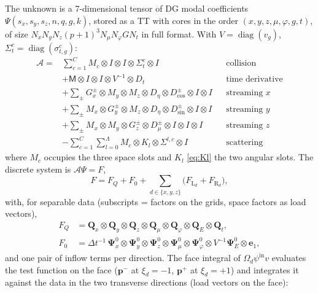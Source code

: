 \documentclass[11pt,a4paper]{article}
\newcommand{\kron}{\otimes}
\newcommand{\Lmax}{\Lambda}
\newcommand{\pp}{{\bm{p}^{+}}}
\newcommand{\pmn}{{\bm{p}^{-}}}
\newcommand{\diag}{\operatorname{diag}}
\begin{document}
The unknown is a 7-dimensional tensor of DG modal coefficients $\Psi(s_x,s_y,s_z,n,q,g,k)$, stored as a TT with cores in the order $(x,y,z,\mu,\varphi,g,t)$, of size $N_xN_yN_z(p+1)^3N_\mu N_\varphi GN_t$ in full format. With $V=\diag(v_g)$, $\Sigma^c_t=\diag(\sigma^c_{t,g})$:
\begin{equation}
\boxed{
\begin{aligned}
\mathcal A={}&\sum_{c=1}^{C}M_c\kron I\kron I\kron\Sigma^c_t\kron I &&\text{collision}\\
&+\mathsf M\kron I\kron I\kron V^{-1}\kron D_t &&\text{time derivative}\\
&+\sum_\pm G^\pm_x\kron M_y\kron M_z\kron D_\eta\kron D^\pm_{\cos}\kron I\kron I &&\text{streaming }x\\
&+\sum_\pm M_x\kron G^\pm_y\kron M_z\kron D_\eta\kron D^\pm_{\sin}\kron I\kron I &&\text{streaming }y\\
&+\sum_\pm M_x\kron M_y\kron G^\pm_z\kron D^\pm_\mu\kron I\kron I\kron I &&\text{streaming }z\\
&-\sum_{c=1}^{C}\sum_{l=0}^{\Lmax}M_c\kron K_l\kron\Sigma^{l,c}\kron I &&\text{scattering}
\end{aligned}}
\label{eq:A}
\end{equation}
where $M_c$ occupies the three space slots and $K_l$ \eqref{eq:Kl} the two angular slots. The discrete system is $\mathcal A\Psi=F$,
\begin{equation}
F=F_Q+F_0+\sum_{d\in\{x,y,z\}}\big(F_{\mathrm L_d}+F_{\mathrm R_d}\big),
\end{equation}
with, for separable data (subscripts = factors on the grids, space factors as load vectors),
\begin{equation}
\begin{aligned}
F_Q&=\bm Q_x\kron\bm Q_y\kron\bm Q_z\kron\bm Q_\mu\kron\bm Q_\varphi\kron\bm Q_E\kron\bm Q_t,\\
F_0&=\Delta t^{-1}\,\bm\Psi^0_x\kron\bm\Psi^0_y\kron\bm\Psi^0_z\kron\bm\Psi^0_\mu\kron\bm\Psi^0_\varphi\kron V^{-1}\bm\Psi^0_E\kron\bm e_1,
\end{aligned}
\label{eq:F-vol}
\end{equation}
and one pair of inflow terms per direction. The face integral of $\Omega_d\psi^{\mathrm{in}}v$ evaluates the test function on the face ($\pmn$ at $\xi_d=-1$, $\pp$ at $\xi_d=+1$) and integrates it against the data in the two transverse directions (load vectors on the face):
\end{document}
